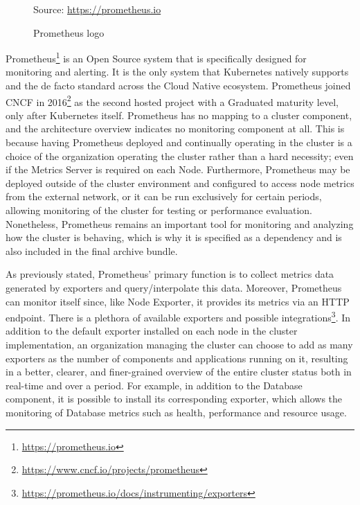 \begin{figure} %
  \centering
  \def\stackalignment{l} %
  {\scriptsize \parbox[t]{\linewidth}{ Source: \url{https://prometheus.io}} }
  \caption{Prometheus logo}
\end{figure}

Prometheus\footnote{\url{https://prometheus.io}} is an Open Source system that
is specifically designed for monitoring and alerting. It is the only system that
Kubernetes natively supports and the de facto standard across the Cloud Native ecosystem.
Prometheus joined CNCF in 2016\footnote{\url{https://www.cncf.io/projects/prometheus}}
as the second hosted project with a Graduated maturity level, only after Kubernetes
itself. Prometheus has no mapping to a cluster component, and the architecture overview
indicates no monitoring component at all. This is because having Prometheus
deployed and continually operating in the cluster is a choice of the
organization operating the cluster rather than a hard necessity; even if the Metrics
Server is required on each Node. Furthermore, Prometheus may be deployed outside
of the cluster environment and configured to access node metrics from the external
network, or it can be run exclusively for certain periods, allowing monitoring of
the cluster for testing or performance evaluation. Nonetheless, Prometheus remains
an important tool for monitoring and analyzing how the cluster is behaving,
which is why it is specified as a dependency and is also included in the final
archive bundle.

As previously stated, Prometheus' primary function is to collect metrics data
generated by exporters and query/interpolate this data. Moreover, Prometheus can
monitor itself since, like Node Exporter, it provides its metrics via an HTTP
endpoint. There is a plethora of available exporters and possible integrations\footnote{\url{https://prometheus.io/docs/instrumenting/exporters}}.
In addition to the default exporter installed on each node in the cluster
implementation, an organization managing the cluster can choose to add as many exporters
as the number of components and applications running on it, resulting in a
better, clearer, and finer-grained overview of the entire cluster status both in
real-time and over a period. For example, in addition to the Database component,
it is possible to install its corresponding exporter, which allows the
monitoring of Database metrics such as health, performance and resource usage.

